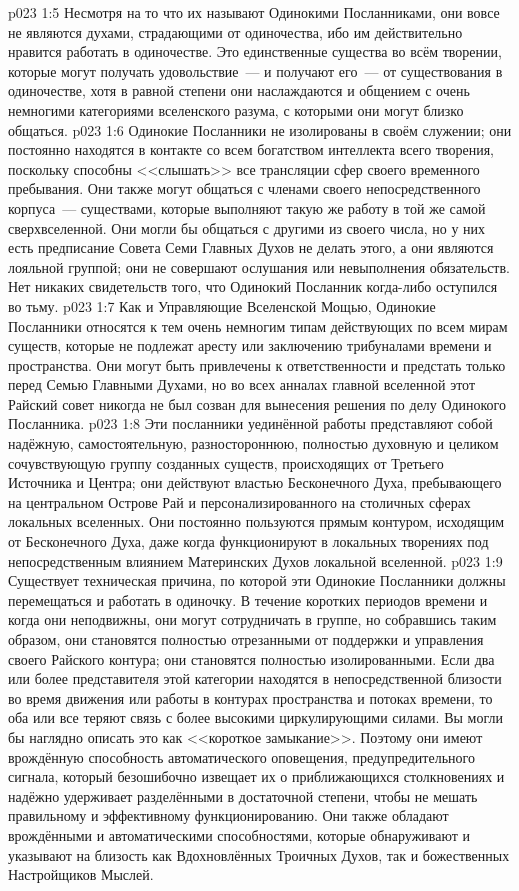 \vs p023 1:5 Несмотря на то что их называют Одинокими Посланниками, они вовсе не являются духами, страдающими от одиночества, ибо им действительно нравится работать в одиночестве. Это единственные существа во всём творении, которые могут получать удовольствие~--- и получают его~--- от существования в одиночестве, хотя в равной степени они наслаждаются и общением с очень немногими категориями вселенского разума, с которыми они могут близко общаться.
\vs p023 1:6 \pc Одинокие Посланники не изолированы в своём служении; они постоянно находятся в контакте со всем богатством интеллекта всего творения, поскольку способны <<слышать>> все трансляции сфер своего временного пребывания. Они также могут общаться с членами своего непосредственного корпуса~--- существами, которые выполняют такую же работу в той же самой сверхвселенной. Они могли бы общаться с другими из своего числа, но у них есть предписание Совета Семи Главных Духов не делать этого, а они являются лояльной группой; они не совершают ослушания или невыполнения обязательств. Нет никаких свидетельств того, что Одинокий Посланник когда\hyp{}либо оступился во тьму.
\vs p023 1:7 Как и Управляющие Вселенской Мощью, Одинокие Посланники относятся к тем очень немногим типам действующих по всем мирам существ, которые не подлежат аресту или заключению трибуналами времени и пространства. Они могут быть привлечены к ответственности и предстать только перед Семью Главными Духами, но во всех анналах главной вселенной этот Райский совет никогда не был созван для вынесения решения по делу Одинокого Посланника.
\vs p023 1:8 Эти посланники уединённой работы представляют собой надёжную, самостоятельную, разностороннюю, полностью духовную и целиком сочувствующую группу созданных существ, происходящих от Третьего Источника и Центра; они действуют властью Бесконечного Духа, пребывающего на центральном Острове Рай и персонализированного на столичных сферах локальных вселенных. Они постоянно пользуются прямым контуром, исходящим от Бесконечного Духа, даже когда функционируют в локальных творениях под непосредственным влиянием Материнских Духов локальной вселенной.
\vs p023 1:9 \pc Существует техническая причина, по которой эти Одинокие Посланники должны перемещаться и работать в одиночку. В течение коротких периодов времени и когда они неподвижны, они могут сотрудничать в группе, но собравшись таким образом, они становятся полностью отрезанными от поддержки и управления своего Райского контура; они становятся полностью изолированными. Если два или более представителя этой категории находятся в непосредственной близости во время движения или работы в контурах пространства и потоках времени, то оба или все теряют связь с более высокими циркулирующими силами. Вы могли бы наглядно описать это как <<короткое замыкание>>. Поэтому они имеют врождённую способность автоматического оповещения, предупредительного сигнала, который безошибочно извещает их о приближающихся столкновениях и надёжно удерживает разделёнными в достаточной степени, чтобы не мешать правильному и эффективному функционированию. Они также обладают врождёнными и автоматическими способностями, которые обнаруживают и указывают на близость как Вдохновлённых Троичных Духов, так и божественных Настройщиков Мыслей.
